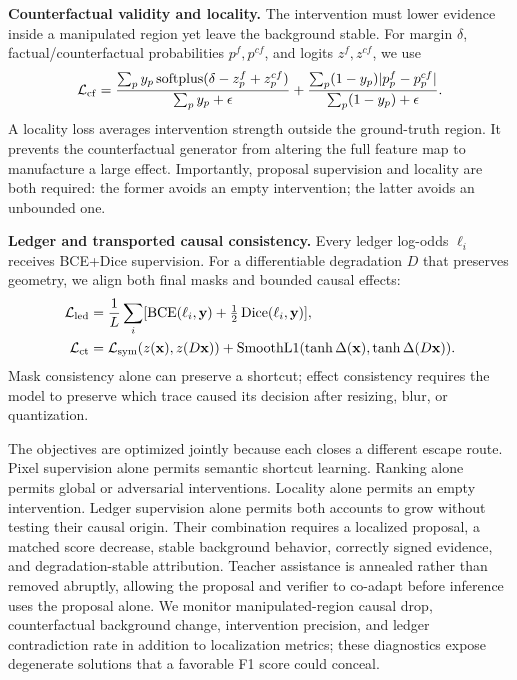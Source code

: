\textbf{Counterfactual validity and locality.}
The intervention must lower evidence inside a manipulated region yet leave the
background stable. For margin $\delta$, factual/counterfactual probabilities
$p^f,p^{cf}$, and logits $z^f,z^{cf}$, we use
\begin{equation}
\mathcal L_{\rm cf}=\frac{\sum_p y_p\operatorname{softplus}
(\delta-z_p^f+z_p^{cf})}{\sum_py_p+\epsilon}
+\frac{\sum_p(1-y_p)|p_p^f-p_p^{cf}|}{\sum_p(1-y_p)+\epsilon}.
\label{eq:new_cf_loss}
\end{equation}
A locality loss averages intervention strength outside the ground-truth region.
It prevents the counterfactual generator from altering the full feature map to
manufacture a large effect. Importantly, proposal supervision and locality are
both required: the former avoids an empty intervention; the latter avoids an
unbounded one.

\textbf{Ledger and transported causal consistency.}
Every ledger log-odds $\ell_i$ receives BCE+Dice supervision. For a differentiable
degradation $D$ that preserves geometry, we align both final masks and bounded
causal effects:
\begin{equation}
\begin{split}
\mathcal L_{\rm led}&=\frac1L\sum_i
[\operatorname{BCE}(\ell_i,\mathbf y)+\tfrac12\operatorname{Dice}(\ell_i,\mathbf y)],\\
\mathcal L_{\rm ct}&=\mathcal L_{\rm sym}(z(\mathbf x),z(D\mathbf x))
+\operatorname{SmoothL1}(\tanh\Delta(\mathbf x),
\tanh\Delta(D\mathbf x)).
\end{split}
\label{eq:new_ledger_consistency}
\end{equation}
Mask consistency alone can preserve a shortcut; effect consistency requires the
model to preserve which trace caused its decision after resizing, blur, or
quantization.

The objectives are optimized jointly because each closes a different escape
route. Pixel supervision alone permits semantic shortcut learning. Ranking alone
permits global or adversarial interventions. Locality alone permits an empty
intervention. Ledger supervision alone permits both accounts to grow without
testing their causal origin. Their combination requires a localized proposal, a
matched score decrease, stable background behavior, correctly signed evidence,
and degradation-stable attribution. Teacher assistance is annealed rather than
removed abruptly, allowing the proposal and verifier to co-adapt before inference
uses the proposal alone. We monitor manipulated-region causal drop,
counterfactual background change, intervention precision, and ledger
contradiction rate in addition to localization metrics; these diagnostics expose
degenerate solutions that a favorable F1 score could conceal.

